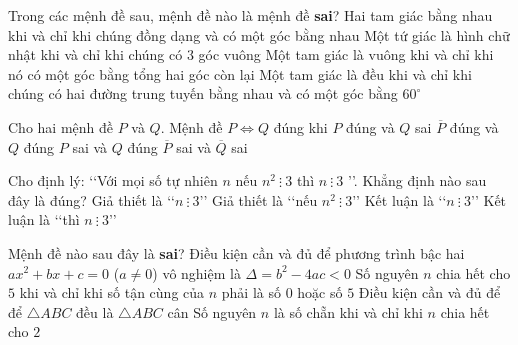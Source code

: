 \begin{ex}%
	Trong các mệnh đề sau, mệnh đề nào  là mệnh đề \textbf{sai}?
	 \choice
		 {\True Hai tam giác bằng nhau khi và chỉ khi chúng đồng dạng và có một góc bằng nhau}
		{Một tứ giác là hình chữ nhật khi và chỉ khi chúng có $3$ góc  vuông}
		{Một tam giác là vuông khi và chỉ  khi nó có một góc bằng tổng hai góc còn lại}
		{Một tam giác là đều khi và chỉ  khi chúng có hai đường trung tuyến bằng nhau và có một góc bằng $60^\circ$}
\end{ex}

\begin{ex}%
	 Cho hai mệnh đề $P$ và $Q$. Mệnh đề $P\Leftrightarrow Q$ đúng khi
	\choice 
		{$P$ đúng và $Q$  sai}
		{$\overline{P}$ đúng và  $Q$ đúng}
		{$P$ sai  và $Q$ đúng}
		 {\True $\overline{P}$ sai và $\overline{Q}$ sai}
\end{ex}

\begin{ex}%
	 Cho định lý: \lq\lq Với mọi số tự nhiên $n$ nếu $n^2\ \vdots\ 3$ thì $n\ \vdots\ 3$ \rq\rq. Khẳng định nào sau đây là đúng?
	\choice 
		{Giả thiết  là \lq\lq $n\ \vdots\ 3$\rq\rq}
		{Giả thiết là \lq\lq  nếu $n^2\ \vdots\ 3$\rq\rq}
		{\True Kết luận là \lq\lq $n\ \vdots\ 3$\rq\rq} 
		{Kết luận là \lq\lq thì  $n\ \vdots\ 3$\rq\rq}
\end{ex}

\begin{ex}%
	Mệnh đề nào sau đây là \textbf{sai}? 
	\choice 
		{Điều  kiện cần và đủ để phương trình bậc hai $ax^2+bx+c=0$ ($ a\ne 0 $) vô nghiệm là $\Delta = b^2-4ac<0$}
		{Số nguyên $n$ chia hết cho $5$ khi và chỉ khi số tận cùng của $n$ phải là số $0$ hoặc số  $5$}
		{\True Điều kiện cần  và đủ để để $\triangle ABC$ đều là $\triangle ABC$ cân}
		{Số nguyên $n$  là số chẵn khi và chỉ khi $n$ chia hết cho $2$}
\end{ex}

